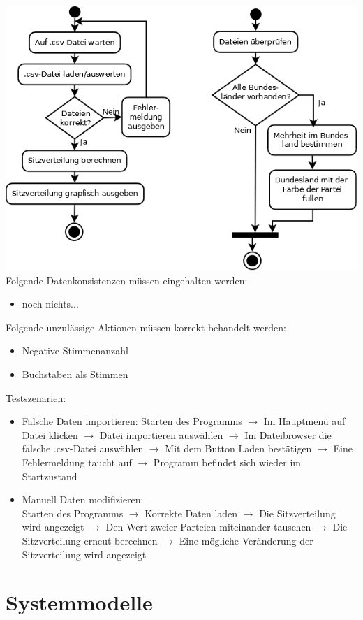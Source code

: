 \documentclass[10pt,a4paper]{article}
\begin{document}
\includegraphics[scale=0.4]{Diagramm1} \\
Folgende Datenkonsistenzen müssen eingehalten werden:
\begin{itemize}
	\item noch nichts...
\end{itemize}
Folgende unzulässige Aktionen müssen korrekt behandelt werden:
\begin{itemize}
	\item Negative Stimmenanzahl
	\item Buchstaben als Stimmen
\end{itemize}
Testszenarien:
\begin{itemize}
	\item Falsche Daten importieren: \newline
	Starten des Programms $\rightarrow$ Im Hauptmenü auf Datei klicken $\rightarrow$ Datei importieren auswählen $\rightarrow$ Im Dateibrowser die falsche .csv-Datei auswählen $\rightarrow$ Mit dem Button Laden bestätigen $\rightarrow$ Eine Fehlermeldung taucht auf $\rightarrow$ Programm befindet sich wieder im Startzustand
	\item Manuell Daten modifizieren: \\
	Starten des Programms $\rightarrow$ Korrekte Daten laden $\rightarrow$ Die Sitzverteilung wird angezeigt $\rightarrow$ Den Wert zweier Parteien miteinander tauschen $\rightarrow$ Die Sitzverteilung erneut berechnen $\rightarrow$ Eine mögliche Veränderung der Sitzverteilung wird angezeigt
	
\end{itemize}
\section{Systemmodelle}
\end{document}
